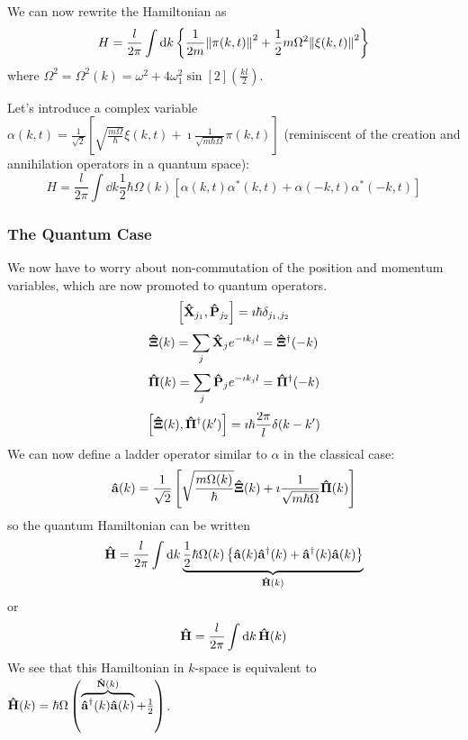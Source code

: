 \documentclass[a4paper,twoside,master.tex]{subfiles}
\begin{document}
We can now rewrite the Hamiltonian as
\begin{equation}
    H = \frac{l}{2 \pi} \int \dd{k} \left\{ \frac{1}{2m} \norm{ \pi(k,t)}^2 + \frac{1}{2} m \Omega^2 \norm{ \xi(k,t)}^2  \right\}
\end{equation}
where $ \Omega^2 = \Omega^2(k) = \omega^2 + 4 \omega_1^2 \sin[2](\frac{kl}{2}) $.

Let's introduce a complex variable $ \alpha(k,t) = \frac{1}{\sqrt{2}} \left[ \sqrt{\frac{m \Omega}{\hbar}} \xi(k,t) + \imath \frac{1}{\sqrt{m \hbar \Omega}} \pi(k,t) \right] $ (reminiscent of the creation and annihilation operators in a quantum space):
\begin{equation}
    H = \frac{l}{2 \pi} \int \dd{k} \frac{1}{2} \hbar \Omega(k) [ \alpha(k,t) \alpha^*(k,t) + \alpha(-k,t) \alpha^*(-k,t)]
\end{equation}

\subsubsection{The Quantum Case}

We now have to worry about non-commutation of the position and momentum variables, which are now promoted to quantum operators.
\begin{equation}
    \comm{ \vu{X}_{j_1}}{ \vu{P}_{j_2}} = \imath \hbar \delta_{j_1,j_2}
\end{equation}
\begin{equation}
    \vu{\Xi}(k) = \sum_j \vu{X}_j e^{- \imath k_j l} = \vu{\Xi}^\dagger(-k)
\end{equation}
\begin{equation}
    \vu{\Pi}(k) = \sum_j \vu{P}_j e^{- \imath k_j l} = \vu{\Pi}^\dagger(-k)
\end{equation}
\begin{equation}
    \comm{ \vu{\Xi}(k)}{ \vu{\Pi}^\dagger(k')} = \imath \hbar \frac{2 \pi}{l} \delta(k - k')
\end{equation}
We can now define a ladder operator similar to $ \alpha $ in the classical case:
\begin{equation}
    \vu{a}(k) = \frac{1}{\sqrt{2}} \left[ \sqrt{\frac{m \Omega(k)}{\hbar}} \vu{\Xi}(k) + \imath \frac{1}{\sqrt{m \hbar \Omega}} \vu{\Pi}(k) \right]
\end{equation}
so the quantum Hamiltonian can be written
\begin{equation}
    \vu{H} = \frac{l}{2 \pi} \int \dd{k} \underbrace{\frac{1}{2} \hbar \Omega(k) \left\{ \vu{a}(k) \vu{a}^\dagger(k) + \vu{a}^\dagger(k) \vu{a}(k) \right\}}_{\vu{H}(k)}
\end{equation}
or
\begin{equation}
    \vu{H} = \frac{l}{2 \pi} \int \dd{k} \vu{H}(k)
\end{equation}
We see that this Hamiltonian in $ k $-space is equivalent to $ \vu{H}(k) = \hbar \Omega \left(\overbrace{ \vu{a}^\dagger(k) \vu{a}(k)}^{ \vu{N}(k)} + \frac{1}{2} \right) $.
\end{document}
